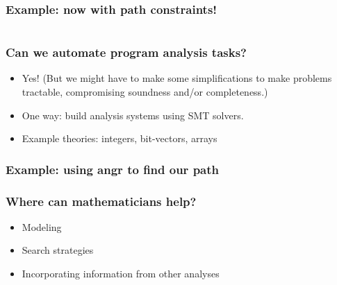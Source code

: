 \documentclass[11pt,table]{beamer}
\begin{document}
\begin{frame}
  \frametitle{Example: now with path constraints!}
  \begin{columns}
\end{columns}
  
\end{frame}

 \begin{frame}
\frametitle{Can we automate program analysis tasks?}
\begin{itemize}
\item{Yes! (But we might have to make some simplifications to make problems tractable, compromising soundness and/or completeness.)}
  \medskip
  \item{One way: build analysis systems using SMT solvers.}
    \medskip
  \item{Example theories: integers, bit-vectors, arrays}
      \end{itemize}
  \end{frame}

  \begin{frame}
\frametitle{Example: using angr to find our path}
  
  \end{frame}

\begin{frame}
\frametitle{Where can mathematicians help?}
\begin{itemize}
\item{Modeling}
  \medskip
\item{Search strategies}
  \medskip
\item{Incorporating information from other analyses}
  \end{itemize}
\end{frame}
\end{document}
